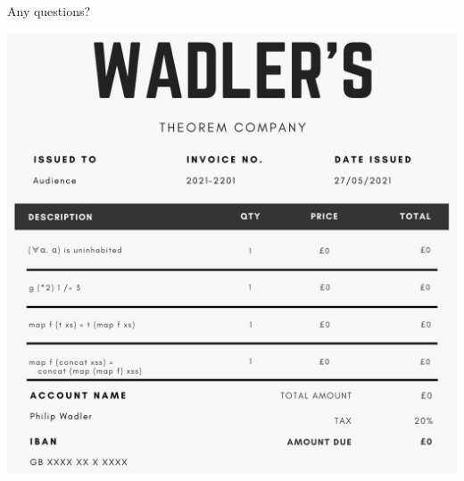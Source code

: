 \documentclass{beamer}
\begin{document}
\begin{frame}[standout]
\Large{\alert{Any questions?}}

\includegraphics[scale=0.49]{wadlers.jpg}
\end{frame}

\end{document}
